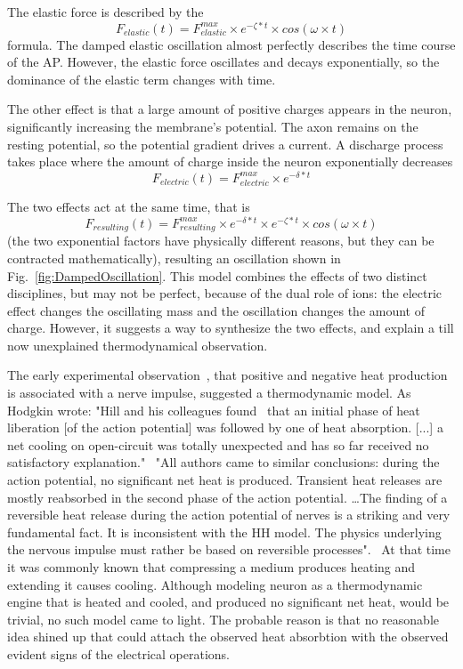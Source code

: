 The elastic force is described by the  
\[
F_{elastic}(t) = F^{max}_{elastic}\times e^{-\zeta*t}\times cos(\omega\times t)
\]
\noindent 
formula. The damped elastic oscillation almost perfectly describes 
the time course of the \gls{AP}. However, the elastic force oscillates and decays exponentially, so the dominance of 
the elastic term changes with time.

The other effect is that a large amount of positive charges
appears in the neuron, significantly increasing the membrane's potential. The axon remains on the resting potential, so the potential gradient drives a current.
A discharge process takes place where the amount of charge
inside the neuron exponentially decreases 
\[
F_{electric}(t) = F^{max}_{electric}\times e^{-\delta*t}
\]

The two effects act at the same time, that is
\[
F_{resulting}(t) = F^{max}_{resulting}\times e^{-\delta*t}  \times e^{-\zeta*t}  \times cos(\omega\times t)
\]
(the two exponential factors have physically different reasons,
but they can be contracted mathematically), resulting
an oscillation shown in Fig.~\ref{fig:DampedOscillation}.
This model combines the effects of two distinct disciplines,
but may not be perfect, because of the dual role of ions:
the electric effect changes the oscillating mass and the oscillation changes the amount of charge. However, it 
suggests a way to synthesize the two effects, and explain 
a till now unexplained thermodynamical observation.


The early experimental observation~\cite{HeatProductionNeuron:1958}, that positive and negative heat production is associated with a nerve impulse, suggested a thermodynamic model. 
As Hodgkin wrote: "Hill and his colleagues found~\cite{HeatProductionNeuron:1958} that an initial phase of heat liberation [of the action potential] was followed by one of
heat absorption. [...] a net cooling on open-circuit was totally unexpected
and has so far received no satisfactory explanation."~\cite{HodgkinConduction:1964}
"All authors came to similar conclusions: during
the action potential, no signiﬁcant net heat is produced. Transient heat releases are mostly reabsorbed in the second phase of the action potential. \dots The ﬁnding of a reversible heat release during the action potential of
nerves is a striking and very fundamental fact. It is inconsistent with the
\gls{HH} model. The physics underlying the nervous impulse
must rather be based on reversible processes".~\cite{ThermalBiophysics:2007} 
At that time it was commonly known that compressing a
medium produces heating and extending it causes cooling.
Although modeling neuron as a thermodynamic engine 
that is heated and cooled, and produced no signiﬁcant net heat, would be trivial, no such model came to light.
The probable reason is that no reasonable idea
shined up that could attach the observed heat absorbtion
with the observed evident signs of the electrical operations.


